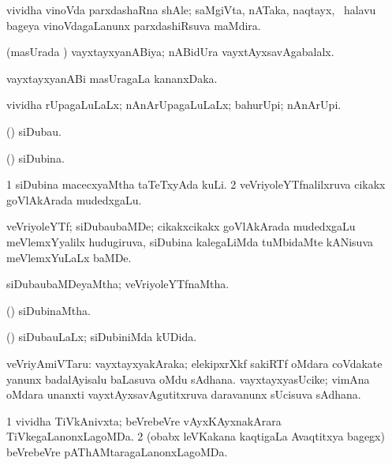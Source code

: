 \bentry
{}
\gl{\nA}
\expl{}
\bmng
 vividha vinoVda parxdashaRna shAle; saMgiVta, nATaka, naqtayx, \mo\ halavu bageya vinoVdagaLanunx parxdashiRsuva maMdira. 
\emng
\eentry

\bentry
{} 
\gl{\gu}
\expl{}
\bmng
 (masUrada \vi) vayxtayxyanABiya; nABidUra vayxtAyxsavAgabalalx. 
\emng
\eentry

\bentry
{} 
\gl{\nA}
\expl{(\bava)}
\bmng
 vayxtayxyanABi masUragaLa kananxDaka. 
\emng
\eentry

\bentry
{} 
\gl{\gu}
\expl{}
\bmng
 vividha rUpagaLuLaLx; nAnArUpagaLuLaLx; bahurUpi; nAnArUpi. 
\emng
\eentry

\bentry
{} 
\gl{\nA}
\expl{}
\bmng
 (\veYshA) siDubau. 
\emng
\eentry

\bentry
{} 
\gl{\gu}
\expl{}
\bmng
 (\veYshA) siDubina. 
\emng
\eentry

\bentry
{} 
\gl{\nA}
\expl{}
\bmng
\bnum
\num{1} siDubina macecxyaMtha taTeTxyAda kuLi. 
\num{2} veVriyoleYTfnalilxruva cikakx goVlAkArada mudedxgaLu. 
\enum
\emng
\eentry

\bentry
{} 
\gl{\nA}
\expl{}
\bmng
 veVriyoleYTf; siDubaubaMDe; cikakxcikakx goVlAkArada mudedxgaLu meVlemxYyalilx hudugiruva, siDubina kalegaLiMda tuMbidaMte kANisuva meVlemxYuLaLx baMDe. 
\emng
\eentry

\bentry
{} 
\gl{\gu}
\expl{}
\bmng
 siDubaubaMDeyaMtha; veVriyoleYTfnaMtha. 
\emng
\eentry

\bentry
{} 
\gl{\gu}
\expl{}
\bmng
 (\veYshA) siDubinaMtha. 
\emng
\eentry

\bentry
{} 
\gl{\gu}
\expl{}
\bmng
 (\veYshA) siDubauLaLx; siDubiniMda kUDida. 
\emng
\eentry

\bentry
{} 
\gl{\nA}
\expl{}
\bmng
 veVriyAmiVTaru: 
\banum
{} vayxtayxyakAraka; elekipxrXkf sakiRTf oMdara coVdakate yanunx badalAyisalu baLasuva oMdu sAdhana. 
 vayxtayxyasUcike; vimAna oMdara unanxti vayxtAyxsavAgutitxruva daravanunx sUcisuva sAdhana. 
\eanum
\emng
\eentry

\bentry
{} 
\gl{\gu}
\expl{}
\bmng
\bnum
\num{1} vividha TiVkAnivxta; beVrebeVre vAyxKAyxnakArara TiVkegaLanonxLagoMDa. 
\num{2} (obabx leVKakana kaqtigaLa Avaqtitxya bagegx) beVrebeVre pAThAMtaragaLanonxLagoMDa. 
\enum
\emng
\eentry

